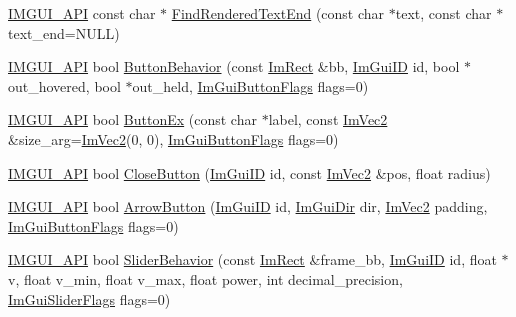 \begin{DoxyCompactItemize}
\item 
\mbox{\hyperlink{imgui_8h_a43829975e84e45d1149597467a14bbf5}{I\+M\+G\+U\+I\+\_\+\+A\+PI}} const char $\ast$ \mbox{\hyperlink{namespace_im_gui_a7671e1dbc803a31b06081b52a771d83f}{Find\+Rendered\+Text\+End}} (const char $\ast$text, const char $\ast$text\+\_\+end=N\+U\+LL)
\item 
\mbox{\hyperlink{imgui_8h_a43829975e84e45d1149597467a14bbf5}{I\+M\+G\+U\+I\+\_\+\+A\+PI}} bool \mbox{\hyperlink{namespace_im_gui_a65a4f18b1bc8ce0f351687922089f374}{Button\+Behavior}} (const \mbox{\hyperlink{struct_im_rect}{Im\+Rect}} \&bb, \mbox{\hyperlink{imgui_8h_a1785c9b6f4e16406764a85f32582236f}{Im\+Gui\+ID}} id, bool $\ast$out\+\_\+hovered, bool $\ast$out\+\_\+held, \mbox{\hyperlink{imgui__internal_8h_a990fae518aa1d95f571ee40989de4c22}{Im\+Gui\+Button\+Flags}} flags=0)
\item 
\mbox{\hyperlink{imgui_8h_a43829975e84e45d1149597467a14bbf5}{I\+M\+G\+U\+I\+\_\+\+A\+PI}} bool \mbox{\hyperlink{namespace_im_gui_ae479220c66b039874c6e4c9e9b22849f}{Button\+Ex}} (const char $\ast$label, const \mbox{\hyperlink{struct_im_vec2}{Im\+Vec2}} \&size\+\_\+arg=\mbox{\hyperlink{struct_im_vec2}{Im\+Vec2}}(0, 0), \mbox{\hyperlink{imgui__internal_8h_a990fae518aa1d95f571ee40989de4c22}{Im\+Gui\+Button\+Flags}} flags=0)
\item 
\mbox{\hyperlink{imgui_8h_a43829975e84e45d1149597467a14bbf5}{I\+M\+G\+U\+I\+\_\+\+A\+PI}} bool \mbox{\hyperlink{namespace_im_gui_a5e8e4df6418dcda3c4c5d15ecdf7d968}{Close\+Button}} (\mbox{\hyperlink{imgui_8h_a1785c9b6f4e16406764a85f32582236f}{Im\+Gui\+ID}} id, const \mbox{\hyperlink{struct_im_vec2}{Im\+Vec2}} \&pos, float radius)
\item 
\mbox{\hyperlink{imgui_8h_a43829975e84e45d1149597467a14bbf5}{I\+M\+G\+U\+I\+\_\+\+A\+PI}} bool \mbox{\hyperlink{namespace_im_gui_ac7c2bd67d2bb2d8ee4b583b1576a0bd3}{Arrow\+Button}} (\mbox{\hyperlink{imgui_8h_a1785c9b6f4e16406764a85f32582236f}{Im\+Gui\+ID}} id, \mbox{\hyperlink{imgui__internal_8h_a4b8427c5153ae1d43278dc397d809335}{Im\+Gui\+Dir}} dir, \mbox{\hyperlink{struct_im_vec2}{Im\+Vec2}} padding, \mbox{\hyperlink{imgui__internal_8h_a990fae518aa1d95f571ee40989de4c22}{Im\+Gui\+Button\+Flags}} flags=0)
\item 
\mbox{\hyperlink{imgui_8h_a43829975e84e45d1149597467a14bbf5}{I\+M\+G\+U\+I\+\_\+\+A\+PI}} bool \mbox{\hyperlink{namespace_im_gui_a3d3b2964eeba76dadaa532232c23fc97}{Slider\+Behavior}} (const \mbox{\hyperlink{struct_im_rect}{Im\+Rect}} \&frame\+\_\+bb, \mbox{\hyperlink{imgui_8h_a1785c9b6f4e16406764a85f32582236f}{Im\+Gui\+ID}} id, float $\ast$v, float v\+\_\+min, float v\+\_\+max, float power, int decimal\+\_\+precision, \mbox{\hyperlink{imgui__internal_8h_a50cc3e3e4beb155e2186f8c1dc057e18}{Im\+Gui\+Slider\+Flags}} flags=0)

\end{DoxyCompactItemize}
